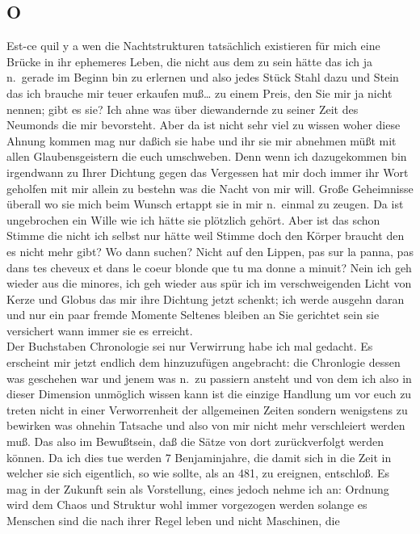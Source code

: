 \documentclass[
]{article}
\author{}
\date{\vspace{-2.5em}}
\begin{document}
\subsection{O}\label{o}

Est-ce qu\textquotesingle il y a wen die Nachtstrukturen tatsächlich
existieren für mich eine Brücke in ihr ephemeres Leben, die nicht aus
dem zu sein hätte das ich ja n.~gerade im Beginn bin zu erlernen und
also jedes Stück Stahl dazu und Stein das ich brauche mir teuer erkaufen
muß\ldots{} zu einem Preis, den Sie mir ja nicht nennen; gibt es sie?
Ich ahne was über diewandernde zu seiner Zeit des Neumonds die mir
bevorsteht. Aber da ist nicht sehr viel zu wissen woher diese Ahnung
kommen mag nur daßich sie habe und ihr sie mir abnehmen müßt mit allen
Glaubensgeistern die euch umschweben. Denn wenn ich dazugekommen bin
irgendwann zu Ihrer Dichtung gegen das Vergessen hat mir doch immer ihr
Wort geholfen mit mir allein zu bestehn was die Nacht von mir will.
Große Geheimnisse überall wo sie mich beim Wunsch ertappt sie in mir
n.~einmal zu zeugen. Da ist ungebrochen ein Wille wie ich hätte sie
plötzlich gehört. Aber ist das schon Stimme die nicht ich selbst nur
hätte weil Stimme doch den Körper braucht den es nicht mehr gibt? Wo
dann suchen? Nicht auf den Lippen, pas sur la panna, pas dans tes
cheveux et dans le coeur blonde que tu m\textquotesingle a donne a
minuit? Nein ich geh wieder aus die minores, ich geh wieder aus spür ich
im verschweigenden Licht von Kerze und Globus das mir ihre Dichtung
jetzt schenkt; ich werde ausgehn daran und nur ein paar fremde Momente
Seltenes bleiben an Sie gerichtet sein sie versichert wann immer sie es
erreicht.\\
Der Buchstaben Chronologie sei nur Verwirrung habe ich mal gedacht. Es
erscheint mir jetzt endlich dem hinzuzufügen angebracht: die Chronlogie
dessen was geschehen war und jenem was n.~zu passiern ansteht und von
dem ich also in dieser Dimension unmöglich wissen kann ist die einzige
Handlung um vor euch zu treten nicht in einer Verworrenheit der
allgemeinen Zeiten sondern wenigstens zu bewirken was ohnehin Tatsache
und also von mir nicht mehr verschleiert werden muß. Das also im
Bewußtsein, daß die Sätze von dort zurückverfolgt werden können. Da ich
dies tue werden 7 Benjaminjahre, die damit sich in die Zeit in welcher
sie sich eigentlich, so wie sollte, als an 481, zu ereignen, entschloß.
Es mag in der Zukunft sein als Vorstellung, eines jedoch nehme ich an:
Ordnung wird dem Chaos und Struktur wohl immer vorgezogen werden solange
es Menschen sind die nach ihrer Regel leben und nicht Maschinen, die
\end{document}
